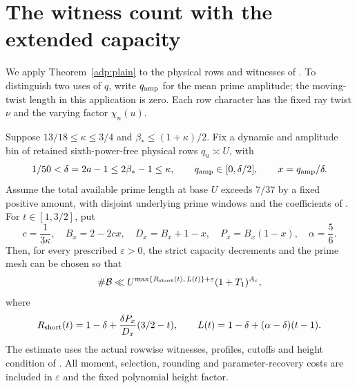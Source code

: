 \section{The witness count with the extended capacity}\label{adp:counts}

We apply Theorem~\ref{adp:plain} to the physical rows and witnesses
of \cite[Sections 8 and 19]{OAI26}. To distinguish two uses of $q$,
write $q_{\rm amp}$ for the mean prime amplitude; the moving-twist
length in this application is zero. Each row character has the fixed
ray twist $\nu$ and the varying factor $\chi_n(u)$.

\begin{proposition}\label{adp:witness-count}
Suppose $13/18\le\kappa\le3/4$ and
$\beta_*\le(1+\kappa)/2$. Fix a dynamic and amplitude bin of
retained sixth-power-free physical rows $q_u\asymp U$, with
\[
 1/50<\delta=2a-1\le2\beta_*-1\le\kappa,\qquad
 q_{\rm amp}\in[0,\delta/2],\qquad x=q_{\rm amp}/\delta .
\]
Assume the total available prime length at base $U$ exceeds $7/37$
by a fixed positive amount, with disjoint underlying prime windows
and the coefficients of \cite[Section 19.2]{OAI26}.
For $t\in[1,3/2]$, put
\[
 c=\frac1{3\kappa},\quad B_x=2-2cx,\quad
 D_x=B_x+1-x,\quad P_x=B_x(1-x),\quad \alpha=\frac56 .
\]
Then, for every prescribed $\varepsilon>0$, the strict capacity
decrements and the prime mesh can be chosen so that
\begin{equation}\label{adp:count}
 \#\mathcal B\ll U^{\max\{R_{\rm short}(t),\,L(t)\}+\varepsilon}
                    (1+T_1)^{A_\varepsilon},
\end{equation}
where
\[
 R_{\rm short}(t)=1-\delta+
             \frac{\delta P_x}{D_x}(3/2-t),\qquad
 L(t)=1-\delta+(\alpha-\delta)(t-1).
\]
The estimate uses the actual rowwise witnesses, profiles, cutoffs
and height condition of \cite[Proposition 8.3]{OAI26}.
All moment, selection, rounding and parameter-recovery costs are
included in $\varepsilon$ and the fixed polynomial height factor.
\end{proposition}


